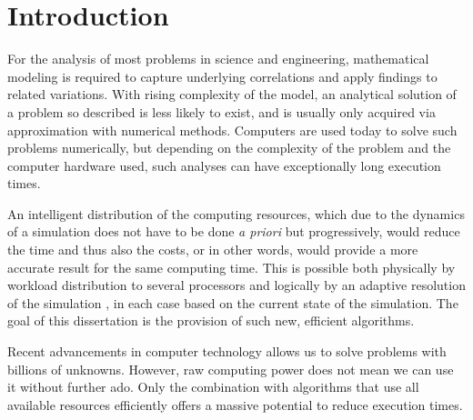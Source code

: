 \chapter{Introduction}
\label{ch:introduction}
\glsresetall

%  


For the analysis of most problems in science and engineering, mathematical modeling is required to capture underlying correlations and apply findings to related variations. With rising complexity of the model, an analytical solution of a problem so described is less likely to exist, and is usually only acquired via approximation with numerical methods. Computers are used today to solve such problems numerically, but depending on the complexity of the problem and the computer hardware used, such analyses can have exceptionally long execution times.

An intelligent distribution of the computing resources, which due to the dynamics of a simulation does not have to be done \textit{a priori} but progressively, would reduce the time and thus also the costs, or in other words, would provide a more accurate result for the same computing time. This is possible both physically by workload distribution to several processors
and logically by
an adaptive resolution of the simulation
, in each case based on the current state of the simulation.
The goal of this dissertation is the provision of such new, efficient algorithms.

Recent advancements in computer technology allows us to solve problems with billions of unknowns. However, raw computing power does not mean we can use it without further ado. Only the combination with algorithms that use all available resources efficiently offers a massive potential to reduce execution times.

